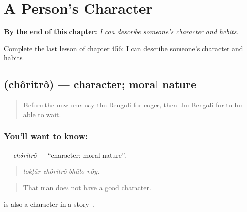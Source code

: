 
\chapter{A Person's Character}
\label{ch:bn-a-person-s-character}

\begin{chapteropening}
\textbf{By the end of this chapter:} \emph{I can describe someone's character and habits.}

Complete the last lesson of chapter 456: I can describe someone's character and habits.
\end{chapteropening}

\section[\texorpdfstring{\bn{চরিত্র} (chôritrô)}{চরিত্র (chôritrô)}]{ (chôritrô) — character; moral nature}

\label{lesson:BN-C456-choritro}



\begin{quote}
Before the new one: say the Bengali for eager, then the Bengali for to be able to wait.
\end{quote}

\subsection*{You'll want to know: }
\textbf{} — \emph{chôritrô} — \textquotedblleft{}character; moral nature\textquotedblright{}.

\begin{quote}
   
\end{quote}

\begin{quote}
\emph{lokṭār chôritrô bhālo nôy.}
\end{quote}

\begin{quote}
That man does not have a good character.
\end{quote}

 is also a character in a story:  .

